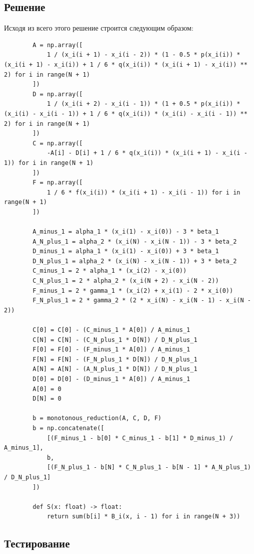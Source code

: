 \documentclass[a4paper,14pt]{extarticle}
\begin{document}
    \subsection{Решение}

    Исходя из всего этого решение строится следующим образом:
    \begin{verbatim}
        A = np.array([
            1 / (x_i(i + 1) - x_i(i - 2)) * (1 - 0.5 * p(x_i(i)) * (x_i(i + 1) - x_i(i)) + 1 / 6 * q(x_i(i)) * (x_i(i + 1) - x_i(i)) ** 2) for i in range(N + 1)
        ])
        D = np.array([
            1 / (x_i(i + 2) - x_i(i - 1)) * (1 + 0.5 * p(x_i(i)) * (x_i(i) - x_i(i - 1)) + 1 / 6 * q(x_i(i)) * (x_i(i) - x_i(i - 1)) ** 2) for i in range(N + 1)
        ])
        C = np.array([
            -A[i] - D[i] + 1 / 6 * q(x_i(i)) * (x_i(i + 1) - x_i(i - 1)) for i in range(N + 1)
        ])
        F = np.array([
            1 / 6 * f(x_i(i)) * (x_i(i + 1) - x_i(i - 1)) for i in range(N + 1)
        ])

        A_minus_1 = alpha_1 * (x_i(1) - x_i(0)) - 3 * beta_1
        A_N_plus_1 = alpha_2 * (x_i(N) - x_i(N - 1)) - 3 * beta_2
        D_minus_1 = alpha_1 * (x_i(1) - x_i(0)) + 3 * beta_1
        D_N_plus_1 = alpha_2 * (x_i(N) - x_i(N - 1)) + 3 * beta_2
        C_minus_1 = 2 * alpha_1 * (x_i(2) - x_i(0))
        C_N_plus_1 = 2 * alpha_2 * (x_i(N + 2) - x_i(N - 2))
        F_minus_1 = 2 * gamma_1 * (x_i(2) + x_i(1) - 2 * x_i(0))
        F_N_plus_1 = 2 * gamma_2 * (2 * x_i(N) - x_i(N - 1) - x_i(N - 2))

        C[0] = C[0] - (C_minus_1 * A[0]) / A_minus_1
        C[N] = C[N] - (C_N_plus_1 * D[N]) / D_N_plus_1
        F[0] = F[0] - (F_minus_1 * A[0]) / A_minus_1
        F[N] = F[N] - (F_N_plus_1 * D[N]) / D_N_plus_1
        A[N] = A[N] - (A_N_plus_1 * D[N]) / D_N_plus_1
        D[0] = D[0] - (D_minus_1 * A[0]) / A_minus_1
        A[0] = 0
        D[N] = 0

        b = monotonous_reduction(A, C, D, F)
        b = np.concatenate([
            [(F_minus_1 - b[0] * C_minus_1 - b[1] * D_minus_1) / A_minus_1],
            b,
            [(F_N_plus_1 - b[N] * C_N_plus_1 - b[N - 1] * A_N_plus_1) / D_N_plus_1]
        ])

        def S(x: float) -> float:
            return sum(b[i] * B_i(x, i - 1) for i in range(N + 3))
    \end{verbatim}

    \subsection{Тестирование}
\end{document}

